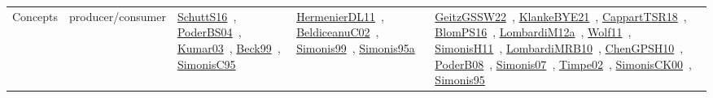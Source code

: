 {\begin{longtable}{lp{3cm}>{\raggedright\arraybackslash}p{6cm}>{\raggedright\arraybackslash}p{6cm}>{\raggedright\arraybackslash}p{8cm}}
Concepts & producer/consumer & \href{works/SchuttS16.pdf}{SchuttS16}~\cite{SchuttS16}, \href{works/PoderBS04.pdf}{PoderBS04}~\cite{PoderBS04}, \href{works/Kumar03.pdf}{Kumar03}~\cite{Kumar03}, \href{works/Beck99.pdf}{Beck99}~\cite{Beck99}, \href{works/SimonisC95.pdf}{SimonisC95}~\cite{SimonisC95} & \href{works/HermenierDL11.pdf}{HermenierDL11}~\cite{HermenierDL11}, \href{works/BeldiceanuC02.pdf}{BeldiceanuC02}~\cite{BeldiceanuC02}, \href{works/Simonis99.pdf}{Simonis99}~\cite{Simonis99}, \href{works/Simonis95a.pdf}{Simonis95a}~\cite{Simonis95a} & \href{works/GeitzGSSW22.pdf}{GeitzGSSW22}~\cite{GeitzGSSW22}, \href{works/KlankeBYE21.pdf}{KlankeBYE21}~\cite{KlankeBYE21}, \href{works/CappartTSR18.pdf}{CappartTSR18}~\cite{CappartTSR18}, \href{works/BlomPS16.pdf}{BlomPS16}~\cite{BlomPS16}, \href{works/LombardiM12a.pdf}{LombardiM12a}~\cite{LombardiM12a}, \href{works/Wolf11.pdf}{Wolf11}~\cite{Wolf11}, \href{works/SimonisH11.pdf}{SimonisH11}~\cite{SimonisH11}, \href{works/LombardiMRB10.pdf}{LombardiMRB10}~\cite{LombardiMRB10}, \href{works/ChenGPSH10.pdf}{ChenGPSH10}~\cite{ChenGPSH10}, \href{works/PoderB08.pdf}{PoderB08}~\cite{PoderB08}, \href{works/Simonis07.pdf}{Simonis07}~\cite{Simonis07}, \href{works/Timpe02.pdf}{Timpe02}~\cite{Timpe02}, \href{works/SimonisCK00.pdf}{SimonisCK00}~\cite{SimonisCK00}, \href{works/Simonis95.pdf}{Simonis95}~\cite{Simonis95}\\

\end{longtable}}
